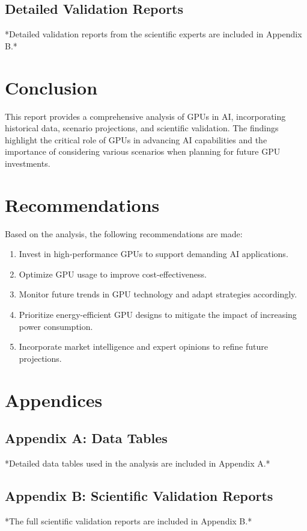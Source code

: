 \documentclass{article}
\begin{document}
\subsection{Detailed Validation Reports}

*Detailed validation reports from the scientific experts are included in Appendix B.*

\section{Conclusion}

This report provides a comprehensive analysis of GPUs in AI, incorporating historical data, scenario projections, and scientific validation. The findings highlight the critical role of GPUs in advancing AI capabilities and the importance of considering various scenarios when planning for future GPU investments.

\section{Recommendations}

Based on the analysis, the following recommendations are made:

\begin{enumerate}
    \item Invest in high-performance GPUs to support demanding AI applications.
    \item Optimize GPU usage to improve cost-effectiveness.
    \item Monitor future trends in GPU technology and adapt strategies accordingly.
    \item Prioritize energy-efficient GPU designs to mitigate the impact of increasing power consumption.
    \item Incorporate market intelligence and expert opinions to refine future projections.
\end{enumerate}

\section*{Appendices}

\subsection*{Appendix A: Data Tables}

*Detailed data tables used in the analysis are included in Appendix A.*

\subsection*{Appendix B: Scientific Validation Reports}

*The full scientific validation reports are included in Appendix B.*
\end{document}
